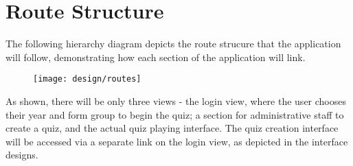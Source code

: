 \section{Route Structure} %
\label{sec:client_routes}
The following hierarchy diagram depicts the route strucure that the application will follow, demonstrating how each section of the application will link.
\begin{figure}[h!]
  \texttt{[image: design/routes]}
\end{figure}
As shown, there will be only three views - the login view, where the user chooses their year and form group to begin the quiz; a section for administrative staff to create a quiz, and the actual quiz playing interface. The quiz creation interface will be accessed via a separate link on the login view, as depicted in the interface designs.
